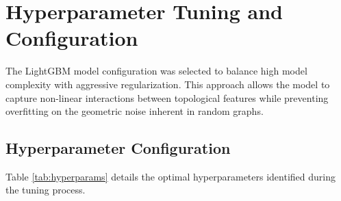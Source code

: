 \documentclass{article}
\begin{document}
\section{Hyperparameter Tuning and Configuration}

The LightGBM model configuration was selected to balance high model complexity with aggressive regularization. This approach allows the model to capture non-linear interactions between topological features while preventing overfitting on the geometric noise inherent in random graphs.

\subsection{Hyperparameter Configuration}

Table \ref{tab:hyperparams} details the optimal hyperparameters identified during the tuning process.
\end{document}
